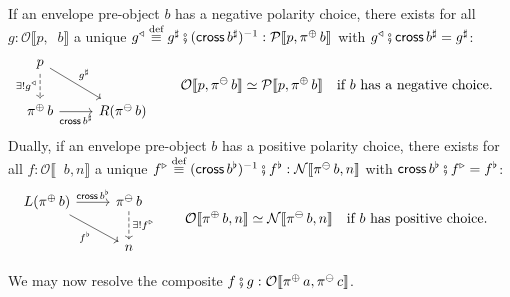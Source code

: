 \documentclass[runningheads]{llncs}
\newcommand{\acat}[1]{\mathcal{#1}}
\newcommand{\PP}{\acat{P}}
\newcommand{\NN}{\acat{N}}
\newcommand{\OO}{\acat{O}}
\newcommand{\dcomp}{\fatsemi}
\newcommand{\morsof}[3]{{#1}\llbracket{#2},{#3}\rrbracket}
\newcommand{\defequiv}{\overset{\mathrm{\textup{def}}}{\equiv}}
\newcommand{\projneg}{\mathop{\pi^{\ominus}}}
\newcommand{\projpos}{\mathop{\pi^{\oplus}}}
\newcommand{\crossmor}{\mathop{\mathsf{cross}}}
\newcommand{\pullR}[1]{{#1}^{\triangleright}}
\newcommand{\pullL}[1]{{#1}^{\triangleleft}}
\begin{document}
\begin{definition}
\label{def:envelope-mor-pull}
If an envelope pre\hyp{}object \(b\) has a negative polarity choice,
there exists for all \(g : \morsof\OO{p}{\projneg b}\) a unique
\(\pullL{g} \defequiv g^\sharp \dcomp (\crossmor b^\sharp)^{-1} :
\morsof\PP{p}{\projpos b}\) with \(\pullL{g} \dcomp \crossmor
b^\sharp = g^\sharp\):
\begin{align*}
\begin{tikzcd}[ampersand replacement=\&]
	p \& \\
	{\projpos b} \& {R(\projneg b)}
	\arrow["{\exists!\pullL{g}}"', dashed, from=1-1, to=2-1]
	\arrow["{g^\sharp}", from=1-1, to=2-2]
	\arrow["{\crossmor b^\sharp}"', from=2-1, to=2-2]
\end{tikzcd} \qquad \morsof\OO{p}{\projneg b} &\simeq \morsof\PP{p}{\projpos b} &&\text{if \(b\) has a negative choice.}
\end{align*}
Dually, if an envelope pre\hyp{}object \(b\) has a positive polarity
choice, there exists for all \(f : \morsof\OO{\projpos{b}}{n}\) a
unique \(\pullR{f} \defequiv (\crossmor b^\flat)^{-1} \dcomp
f^\flat : \morsof\NN{\projneg{b}}{n}\) with \(\crossmor b^\flat
\dcomp \pullR{f} = f^\flat\):
\begin{align*}
\begin{tikzcd}[ampersand replacement=\&]
	{L(\projpos b)} \& {\projneg b} \\
	\& n
	\arrow["{\crossmor b^\flat}", from=1-1, to=1-2]
	\arrow["{f^\flat}"', from=1-1, to=2-2]
	\arrow["{\exists!\pullR{f}}", dashed, from=1-2, to=2-2]
\end{tikzcd} \qquad \morsof\OO{\projpos b}{n} &\simeq
\morsof\NN{\projneg b}{n} &&\text{if \(b\) has positive choice.}
\end{align*}
\end{definition}

We may now resolve the composite \(f \dcomp g : \morsof\OO{\projpos
a}{\projneg c}\).
\end{document}
